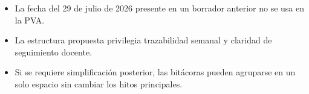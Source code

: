 \documentclass[11pt]{article}
\begin{document}
\begin{itemize}
\item La fecha del 29 de julio de 2026 presente en un borrador anterior no se usa en la PVA.
\item La estructura propuesta privilegia trazabilidad semanal y claridad de seguimiento docente.
\item Si se requiere simplificaci\'on posterior, las bit\'acoras pueden agruparse en un solo espacio sin cambiar los hitos principales.
\end{itemize}
\end{document}
